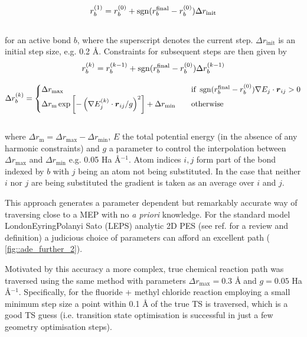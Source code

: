 \documentclass[../../main.tex]{subfiles}
\begin{document}
\begin{equation}
	r_b^{(1)} = r_b^{(0)} + \operatorname{sgn}(r_b^\text{final} - r_b^{(0)})\Delta r_\text{init}
\end{equation}
\\
for an active bond $b$, where the superscript denotes the current step. $\Delta r_\text{init}$ is an initial step size, e.g. 0.2 \AA. Constraints for subsequent steps are then given by
\\
\begin{equation}
	r_b^{(k)} = r_b^{(k-1)} + \operatorname{sgn}(r_b^\text{final} - r_b^{(0)})\Delta r_b^{(k-1)}
\end{equation}

\begin{equation}
	\Delta r_b^{(k)} = 
	\begin{cases}
		\Delta r_\text{max} \quad &\text{if } \operatorname{sgn}(r_b^\text{final} - r_b^{(0)}) \nabla E_{j} \cdot \boldsymbol{r}_{ij} > 0 \\
		\Delta r_\text{m}\exp\left[-\left({\nabla E_{j}^{(k)} \cdot \boldsymbol{r}_{ij}}/{g} \right)^2\right] + \Delta r_\text{min} \quad &\text{otherwise}
	\end{cases}
\end{equation}
\\
where $\Delta r_\text{m} = \Delta r_\text{max} - \Delta r_\text{min}$, $E$ the total potential energy (in the absence of any harmonic constraints) and $g$ a parameter to control the interpolation between $\Delta r_\text{max}$ and $\Delta r_\text{min}$ e.g. 0.05 Ha Å$^{-1}$. Atom indices $i, j$ form part of the bond indexed by $b$ with $j$ being an atom not being substituted. In the case that neither $i$ nor $j$ are being substituted the gradient is taken as an average over $i$ and $j$.

This approach generates a parameter dependent but remarkably accurate way of traversing close to a MEP with no \emph{a priori} knowledge. For the standard model London{\textendash}Eyring{\textendash}Polanyi {\textendash}Sato (LEPS) analytic 2D PES (see ref. \cite{MartinGondre2010} for a review and definition) a judicious choice of parameters can afford an excellent path (\figurename{ \ref{fig::ade_further_2}}).

Motivated by this accuracy a more complex, true chemical reaction path was traversed using the same method with parameters $\Delta r_\text{max} = 0.3$ \AA$\;$and $g = 0.05$ Ha \AA$^{-1}$. Specifically, for the fluoride + methyl chloride reaction employing a small minimum step size a point within 0.1 \AA$\;$of the true TS is traversed, which is a good TS guess (i.e. transition state optimisation is successful in just a few geometry optimisation steps).
\end{document}
